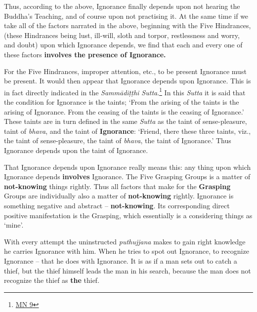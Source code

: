 Thus, according to the above, Ignorance finally depends upon not hearing the Buddha's Teaching, and of course upon not practising it. At the same time if we take all of the factors narrated in the above, beginning with the Five Hindrances, (these Hindrances being lust, ill-will, sloth and torpor, restlessness and worry, and doubt) upon which Ignorance depends, we find that each and every one of these factors \textbf{involves the presence of Ignorance.}

For the Five Hindrances, improper attention, etc., to be present Ignorance must be present. It would then appear that Ignorance depends upon Ignorance. This is in fact directly indicated in the \emph{Sammādiṭṭhi Sutta}.\footnote{\href{https://suttacentral.net/mn9/en/bodhi}{MN 9}} In this \emph{Sutta} it is said that the condition for Ignorance is the taints; `From the arising of the taints is the arising of Ignorance. From the ceasing of the taints is the ceasing of Ignorance.' These taints are in turn defined in the same \emph{Sutta} as the taint of sense-pleasure, taint of \emph{bhava}, and the taint of \textbf{Ignorance}: `Friend, there these three taints, viz., the taint of sense-pleasure, the taint of \emph{bhava}, the taint of Ignorance.' Thus Ignorance depends upon the taint of Ignorance.

That Ignorance depends upon Ignorance really means this: any thing upon which Ignorance depends \textbf{involves} Ignorance. The Five Grasping Groups is a matter of \textbf{not-knowing} things rightly. Thus all factors that make for the \textbf{Grasping} Groups are individually also a matter of \textbf{not-knowing} rightly. Ignorance is something negative and abstract -- \textbf{not-knowing}. Its corresponding direct positive manifestation is the Grasping, which essentially is a considering things as `mine'.

With every attempt the uninstructed \emph{puthujjana} makes to gain right knowledge he carries Ignorance with him. When he tries to spot out Ignorance, to recognize Ignorance -- that he does with Ignorance. It is as if a man sets out to catch a thief, but the thief himself leads the man in his search, because the man does not recognize the thief as \textbf{the} thief.

